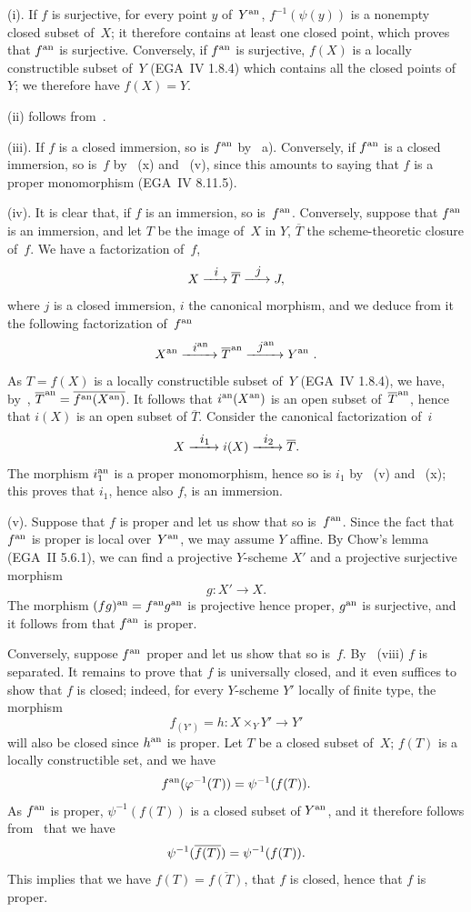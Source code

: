 (i). If $f$ is surjective, for every point $y$ of~$Y^{\mathrm{an}}$, $f^{-1}
(\psi (y)) $ is a nonempty closed subset of~$X$; it therefore
contains at least one closed point, which proves that $f^{\mathrm{an}}$ is
surjective. Conversely, if $f^{\mathrm{an}}$ is surjective, $f(X)$ is a
locally constructible subset of~$Y$ (EGA~IV 1.8.4) which contains
all the closed points of~$Y$; we therefore have $f(X)=Y$.

(ii) follows from~.

(iii). If $f$ is a closed immersion, so is
$f^{\mathrm{an}}$ by ~a). Conversely, if $f^{\mathrm{an}}$ is a closed
immersion, so is~$f$ by
~(x) and ~(v), since this amounts to saying
that $f$ is a proper monomorphism (EGA~IV 8.11.5).

(iv). It is clear that, if $f$ is an immersion, so is~$f^{\mathrm{an}}$.
Conversely, suppose that $f^{\mathrm{an}}$ is an
immersion, and let $T$ be the image of~$X$ in $Y$, $\overline{T}$
the scheme-theoretic closure of~$f$. We have a factorization of~$f$,
$$
X \lto{i} \overline{T} \lto{j} J \quoi,
$$
where $j$ is a closed immersion, $i$ the canonical morphism,
and we deduce from it the following factorization of~$f^{\mathrm{an}}$
$$
X^\an \lto{i^\an} \overline{T}^{\mkern1mu \an} \lto{j^\an} Y^\an \
.
$$
As
$T = f(X)$ is a locally constructible subset of~$Y$ (EGA~IV
1.8.4), we have, by~, $\overline{T}^{\mkern1mu \mathrm{an}} =
\overline{f^{\mathrm{an}} (X^{\mathrm{an}} )}$. It follows that $i^{\mathrm{an}} (X^{\mathrm{an}} )$ is
an open subset of~$\overline{T}^{\mkern1mu \mathrm{an}}$, hence that $i(X) $ is an open subset of
$\overline{T}$. Consider the canonical factorization of~$i$
$$
X \lto{i_1} i (X) \lto{i_2} \overline{T}.
$$
The morphism $i_1^{\mathrm{an}} $ is a proper monomorphism, hence so is
$i_1$ by ~(v) and ~(x);
this proves that $i_1$, hence also $f$, is an immersion.

(v). Suppose that $f$ is proper and let us show that so is~$f^{\mathrm{an}}$.
Since the fact that $f^{\mathrm{an}} $ is proper is local
over~$Y^{\mathrm{an}}$, we may assume $Y$ affine. By Chow's lemma
(EGA~II 5.6.1), we can find a projective $Y$-scheme $X'$ and a
projective surjective morphism
$$
g \colon X' \to X.
$$
The morphism $(fg)^{\mathrm{an}} = f^{\mathrm{an}} g^{\mathrm{an}} $ is projective hence proper,
$g^{\mathrm{an}} $ is surjective, and it follows from \cite[ch\ptbl 1 \S 10]{XII.1} that
$f^{\mathrm{an}} $ is proper.

Conversely, suppose $f^{\mathrm{an}} $ proper and let us show that so is~$f$.
By \Ref{XII.3.1}~(viii) $f$ is
separated. It remains to prove that $f$ is universally
closed, and it even suffices to show that $f$ is closed; indeed,
for every $Y$-scheme $Y'$ locally of finite type, the
morphism
$$
f_{(Y')} = h \colon X \times_Y Y' \to Y'
$$
will also be closed since $h^{\mathrm{an}} $ is proper. Let $T$ be a closed
subset of~$X$; $f(T)$ is a locally constructible set, and
we have
$$
f^{\mathrm{an}} (\varphi^{-1} (T)) = \psi^{-1} (f(T)).
$$
As
$f^{\mathrm{an}} $ is proper, $\psi^{-1} (f (T))$ is a closed subset of
$Y^{\mathrm{an}} $, and it therefore follows from~ that we have
$$
\psi^{-1} (\overline{f(T)}) = \psi^{-1} (f(T)) .
$$
This implies that we have $f(T) = \overline{f(T)}$, \ie that $f$
is closed, hence that $f$ is proper.

